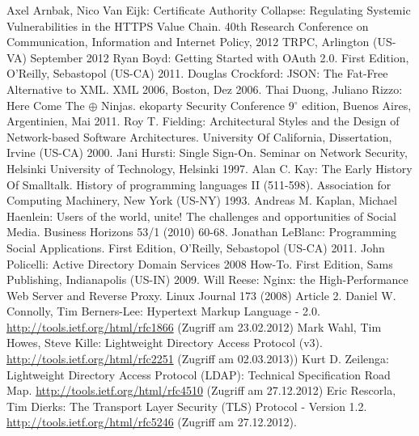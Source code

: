 \documentclass[12pt,a4paper,pointednumbers,abstracton]{scrartcl}
\begin{document}
\newpage
{}
\begin{raggedright}%
\begin{thebibliography}{XXXXXXXX}
     Axel Arnbak, Nico Van Eijk: Certificate Authority Collapse: Regulating Systemic Vulnerabilities in the HTTPS Value Chain. 40th Research Conference on Communication, Information and Internet Policy, 2012 TRPC, Arlington (US-VA) September 2012
	 Ryan Boyd: Getting Started with OAuth 2.0. First Edition, O'Reilly, Sebastopol (US-CA) 2011.
	 Douglas Crockford: JSON: The Fat-Free Alternative to XML. XML 2006, Boston, Dez 2006.
	 Thai Duong, Juliano Rizzo: Here Come The $\oplus$ Ninjas. ekoparty Security Conference 9$^\circ$ edition, Buenos Aires, Argentinien, Mai 2011.
	 Roy T. Fielding: Architectural Styles and the Design of Network-based Software Architectures. University Of California, Dissertation, Irvine (US-CA) 2000.
	 Jani Hursti: Single Sign-On. Seminar on Network Security, Helsinki University of Technology, Helsinki 1997.
	 Alan C. Kay: The Early History Of Smalltalk. History of programming languages II (511-598). Association for Computing Machinery, New York (US-NY) 1993.
	 Andreas M. Kaplan, Michael Haenlein: Users of the world, unite! The challenges and opportunities of Social Media. Business Horizons 53/1 (2010) 60-68.
	 Jonathan LeBlanc: Programming Social Applications. First Edition, O'Reilly, Sebastopol (US-CA) 2011.
	 John Policelli: Active Directory Domain Services 2008 How-To. First Edition, Sams Publishing, Indianapolis (US-IN) 2009.
	 Will Reese:  Nginx: the High-Performance Web Server and Reverse Proxy. Linux Journal 173 (2008) Article 2.
	 Daniel W. Connolly, Tim Berners-Lee: Hypertext Markup Language - 2.0. \url{http://tools.ietf.org/html/rfc1866} (Zugriff am 23.02.2012)
	 Mark Wahl, Tim Howes, Steve Kille: Lightweight Directory Access Protocol (v3). \url{http://tools.ietf.org/html/rfc2251} (Zugriff am 02.03.2013))
	 Kurt D. Zeilenga: Lightweight Directory Access Protocol (LDAP): Technical Specification Road Map. \url{http://tools.ietf.org/html/rfc4510} (Zugriff am 27.12.2012)
	 Eric Rescorla, Tim Dierks: The Transport Layer Security (TLS) Protocol - Version 1.2. \url{http://tools.ietf.org/html/rfc5246} (Zugriff am 27.12.2012).

\end{thebibliography}
\end{raggedright}
\end{document}
